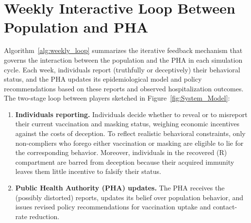 \documentclass[sigconf,review]{acmart}
\begin{document}
\section{Weekly Interactive Loop Between Population and PHA}
\label{supp:weekly-loop}
Algorithm~\ref{alg:weekly_loop} summarizes the iterative feedback mechanism that governs the interaction between the population and the PHA in each simulation cycle. Each week, individuals report (truthfully or deceptively) their behavioral status, and the PHA updates its epidemiological model and policy recommendations based on these reports and observed hospitalization outcomes. The two-stage loop between players sketched in Figure~\ref{fig:System_Model}:

\begin{enumerate}
\item {\bf Individuals reporting.} Individuals decide whether to reveal or to misreport their current vaccination and masking status, weighing economic incentives against the costs of deception. To reflect realistic behavioral constraints, only non-compliers who forego either vaccination or masking are eligible to lie for the corresponding behavior. Moreover, individuals in the recovered (R) compartment are barred from deception because their acquired immunity leaves them little incentive to falsify their status.

\item {\bf Public Health Authority (PHA) updates.} The PHA receives the (possibly distorted) reports, updates its belief over population behavior, and issues revised policy recommendations for vaccination uptake and contact-rate reduction.
\end{enumerate}
\end{document}
